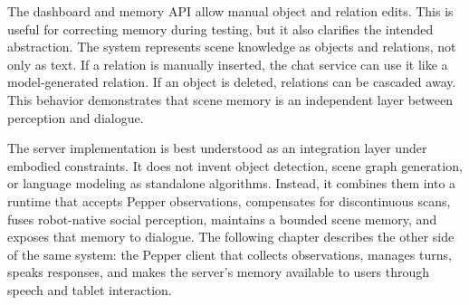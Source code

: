 The dashboard and memory API allow manual object and relation edits. This is useful for correcting memory during testing, but it also clarifies the intended abstraction. The system represents scene knowledge as objects and relations, not only as text. If a relation is manually inserted, the chat service can use it like a model-generated relation. If an object is deleted, relations can be cascaded away. This behavior demonstrates that scene memory is an independent layer between perception and dialogue.

The server implementation is best understood as an integration layer under embodied constraints. It does not invent object detection, scene graph generation, or language modeling as standalone algorithms. Instead, it combines them into a runtime that accepts Pepper observations, compensates for discontinuous scans, fuses robot-native social perception, maintains a bounded scene memory, and exposes that memory to dialogue. The following chapter describes the other side of the same system: the Pepper client that collects observations, manages turns, speaks responses, and makes the server's memory available to users through speech and tablet interaction.
